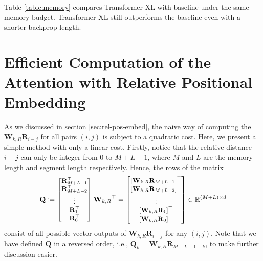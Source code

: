 \documentclass[11pt,a4paper]{article}
\def\rmQ{{\mathbf{Q}}}
\def\rmR{{\mathbf{R}}}
\def\rmW{{\mathbf{W}}}
\newcommand{\R}{\mathbb{R}}
\begin{document}
Table \ref{table:memory} compares Transformer-XL with baseline under the same memory budget. Transformer-XL still outperforms the baseline even with a shorter backprop length.

\section{Efficient Computation of the Attention with Relative Positional Embedding}
\label{sec:A-efficient-attention}
As we discussed in section \ref{sec:rel-pos-embed}, the naive way of computing the $\rmW_{k,R} \rmR_{i-j}$ for all pairs $(i, j)$ is subject to a quadratic cost.
Here, we present a simple method with only a linear cost.
Firstly, notice that the relative distance $i - j$ can only be integer from 0 to $M+L-1$, where $M$ and $L$ are the memory length and segment length respectively.
Hence, the rows of the matrix
\[\small
	\rmQ
	\coloneqq \begin{bmatrix} \rmR_{M+L-1}^\top \\ \rmR_{M+L-2}^\top \\ \vdots \\ \rmR_{1}^\top \\ \rmR_{0}^\top \end{bmatrix} {\rmW_{k,R}}^\top
	= \begin{bmatrix}
		\left[ \rmW_{k,R} \rmR_{M+L-1} \right]^\top \\
		\left[ \rmW_{k,R} \rmR_{M+L-2} \right]^\top \\ \vdots \\
		\left[ \rmW_{k,R} \rmR_{1} \right]^\top \\
		\left[ \rmW_{k,R} \rmR_{0} \right]^\top \end{bmatrix}
	\in \R^{(M+L) \times d}
\]
consist of all possible vector outputs of $\rmW_{k,R} \rmR_{i-j}$ for any $(i, j)$.
Note that we have defined $\rmQ$ in a reversed order, i.e., $\rmQ_k = \rmW_{k,R} \rmR_{M+L-1-k}$, to make further discussion easier.
\end{document}
